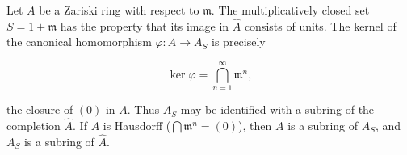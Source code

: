 Let $A$ be a Zariski ring with respect to $\mathfrak{m}$. The multiplicatively closed set $S = 1 + \mathfrak{m}$ has the property that its image in $\hat{A}$ consists of units. The kernel of the canonical homomorphism $\varphi: A \to A_S$ is precisely

$$\ker \varphi = \bigcap_{n=1}^{\infty} \mathfrak{m}^n,$$

the closure of $(0)$ in $A$. Thus $A_S$ may be identified with a subring of the completion $\hat{A}$. If $A$ is Hausdorff ($\bigcap \mathfrak{m}^n = (0)$), then $A$ is a subring of $A_S$, and $A_S$ is a subring of $\hat{A}$.